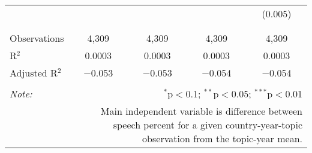 \begin{table}[!htbp]
\begin{tabular}{@{\extracolsep{5pt}}lcccc}
  &  &  &  & (0.005) \\ 
  & & & & \\ 
\hline \\[-1.8ex] 
Observations & 4,309 & 4,309 & 4,309 & 4,309 \\ 
R$^{2}$ & 0.0003 & 0.0003 & 0.0003 & 0.0003 \\ 
Adjusted R$^{2}$ & $-$0.053 & $-$0.053 & $-$0.054 & $-$0.054 \\ 
\hline 
\hline \\[-1.8ex] 
\textit{Note:}  & \multicolumn{4}{r}{$^{*}$p$<$0.1; $^{**}$p$<$0.05; $^{***}$p$<$0.01} \\ 
 & \multicolumn{4}{r}{Main independent variable is difference between speech percent for a given country-year-topic observation from the topic-year mean.} \\ 
\end{tabular} 
\end{table} 

